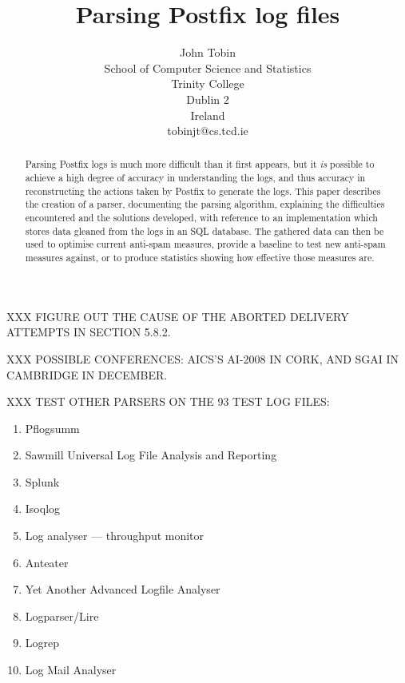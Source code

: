 \documentclass[a4paper,12pt,draft]{article}
\newcounter{dummy}
\begin{document}


\title{Parsing Postfix log files}
\author{John Tobin \\ School of Computer Science and Statistics \\
Trinity College \\ Dublin 2 \\ Ireland \\ tobinjt@cs.tcd.ie}
\maketitle

\begin{abstract}

    Parsing Postfix logs is much more difficult than it first appears, but
    it \textit{is\/} possible to achieve a high degree of accuracy in
    understanding the logs, and thus accuracy in reconstructing the actions
    taken by Postfix to generate the logs.  This paper describes the
    creation of a parser, documenting the parsing algorithm, explaining the
    difficulties encountered and the solutions developed, with reference to
    an implementation which stores data gleaned from the logs in an SQL
    database.  The gathered data can then be used to optimise current
    anti-spam measures, provide a baseline to test new anti-spam measures
    against, or to produce statistics showing how effective those measures
    are.

\end{abstract}

XXX FIGURE OUT THE CAUSE OF THE ABORTED DELIVERY ATTEMPTS IN SECTION
5.8.2\@.

XXX POSSIBLE CONFERENCES\@: AICS'S AI-2008 IN CORK, AND SGAI IN CAMBRIDGE
IN DECEMBER\@.

XXX TEST OTHER PARSERS ON THE 93 TEST LOG FILES\@:

\begin{enumerate}

    \item Pflogsumm
    \item Sawmill Universal Log File Analysis and Reporting
    \item Splunk
    \item Isoqlog
    \item Log analyser --- throughput monitor
    \item Anteater
    \item Yet Another Advanced Logfile Analyser
    \item Logparser/Lire
    \item Logrep
    \item Log Mail Analyser

\end{enumerate}
\end{document}
